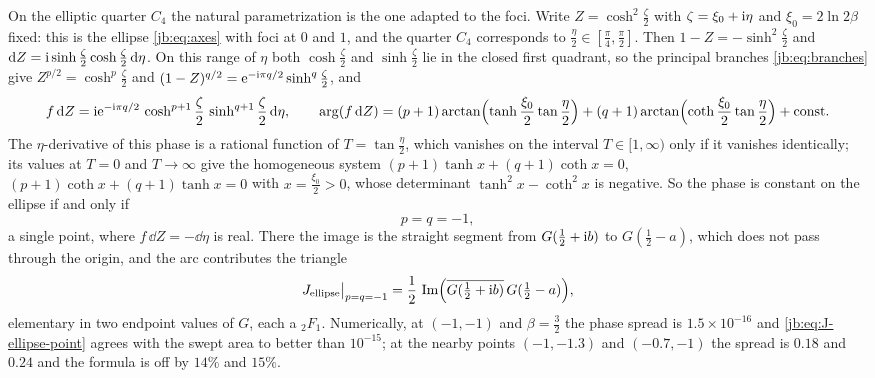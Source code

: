 On the elliptic quarter $C_4$ the natural parametrization is the one adapted to the foci.
Write $Z = \cosh^2 \tfrac{\zeta}{2}$ with $\zeta = \xi_0 + \mathrm{i} \eta$ and $\xi_0 = 2 \ln 2 \beta$
fixed: this is the ellipse \eqref{jb:eq:axes} with foci at $0$ and $1$, and the quarter $C_4$
corresponds to $\tfrac{\eta}{2} \in [\tfrac{\pi}{4}, \tfrac{\pi}{2}]$.
Then $1 - Z = - \sinh^2 \tfrac{\zeta}{2}$ and
$\mathrm{d} Z = \mathrm{i} \sinh \tfrac{\zeta}{2} \cosh \tfrac{\zeta}{2} \, \mathrm{d} \eta$.
On this range of $\eta$ both $\cosh \tfrac{\zeta}{2}$ and $\sinh \tfrac{\zeta}{2}$ lie in the
closed first quadrant, so the principal branches \eqref{jb:eq:branches} give
$Z^{p/2} = \cosh^p \tfrac{\zeta}{2}$ and $(1 - Z)^{q/2} = \mathrm{e}^{- \mathrm{i} \pi q/2} \sinh^q \tfrac{\zeta}{2}$,
and
\begin{equation}
  \label{jb:eq:phase-ellipse}
  f \, \mathrm{d} Z
    = \mathrm{i} \mathrm{e}^{- \mathrm{i} \pi q / 2} \, \cosh^{p + 1} \frac{\zeta}{2} \, \sinh^{q + 1} \frac{\zeta}{2} \,
      \mathrm{d} \eta,
  \qquad
  \arg (f \, \mathrm{d} Z)
    = (p + 1) \arctan \Bigl( \tanh \frac{\xi_0}{2} \tan \frac{\eta}{2} \Bigr)
      + (q + 1) \arctan \Bigl( \coth \frac{\xi_0}{2} \tan \frac{\eta}{2} \Bigr)
      + \text{const}.
\end{equation}
The $\eta$-derivative of this phase is a rational function of $T = \tan \tfrac{\eta}{2}$, which
vanishes on the interval $T \in [1, \infty)$ only if it vanishes identically; its values at $T = 0$
and $T \to \infty$ give the homogeneous system
$(p + 1) \tanh x + (q + 1) \coth x = 0$, $(p + 1) \coth x + (q + 1) \tanh x = 0$ with
$x = \tfrac{\xi_0}{2} > 0$, whose determinant $\tanh^2 x - \coth^2 x$ is negative.
So the phase is constant on the ellipse if and only if
\begin{equation}
  \label{jb:eq:ellipse-point}
  p
    = q
    = -1,
\end{equation}
a single point, where $f \, \dd Z = - \dd \eta$ is real.
There the image is the straight segment from $G(\tfrac12 + \mathrm{i} b)$ to $G(\tfrac12 - a)$, which does
not pass through the origin, and the arc contributes the triangle
\begin{equation}
  \label{jb:eq:J-ellipse-point}
  J_{\text{ellipse}} \big|_{p = q = -1}
    = \frac12 \, \operatorname{Im} \Bigl( \overline{G(\tfrac12 + \mathrm{i} b)} \, G(\tfrac12 - a) \Bigr),
\end{equation}
elementary in two endpoint values of $G$, each a ${}_2F_1$.
Numerically, at $(-1, -1)$ and $\beta = \tfrac32$ the phase spread is $1.5 \times 10^{-16}$ and
\eqref{jb:eq:J-ellipse-point} agrees with the swept area to better than $10^{-15}$; at the nearby
points $(-1, -1.3)$ and $(-0.7, -1)$ the spread is $0.18$ and $0.24$ and the formula is off by
$14 \%$ and $15 \%$.

